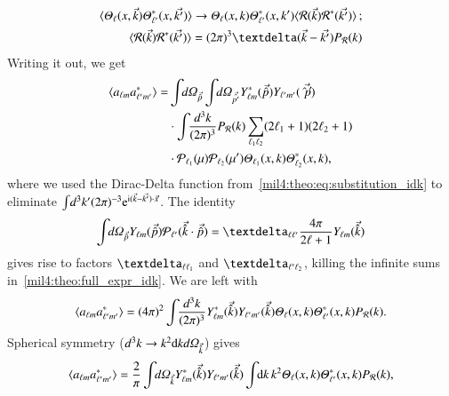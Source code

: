 \begin{equation}\label{mil4:theo:eq:substitution_idk}
\begin{split}
    \langle \Theta_\ell(x,\vec{k}) \Theta_{\ell'}^*(x,\vec{k'})\rangle \to \Theta_\ell(x,k) \Theta_{\ell'}^*(x,k') \langle \mathcal{R}(\vec{k}) \mathcal{R}^*(\vec{k'}) \rangle \,; \\
    \quad \langle \mathcal{R}(\vec{k}) \mathcal{R}^*(\vec{k'}) \rangle = (2\pi)^3 \deltafunc{\vec{k}-\vec{k'}} P_\mathcal{R}(k) 
\end{split}
\end{equation}
Writing it out, we get
\begin{equation}\label{mil4:theo:full_expr_idk}
\begin{split}
    \langle a\ellm a^*\ellmp \rangle =&  \int \dOmg[p] \int \dOmg[p'] Y_{\ell m}^*(\vec{\hat{p}}) Y_{\ell' m'}(\vec{\hat{p}'})  \\
    &\cdot \int \dkkk P_\mathcal{R}(k)  \sum_{\ell_1 \ell_2} (2\ell_1 +1) (2\ell_2 +1) \\
    &\cdot \mathcal{P}_{\ell_1}(\mu)\mathcal{P}_{\ell_2}(\mu')\Theta_{\ell_1}(x,k) \Theta^{*}_{\ell_2}(x,k) ,
\end{split}
\end{equation} 
where we used the Dirac-Delta function from~\cref{mil4:theo:eq:substitution_idk} to eliminate $\int \! d^3k' (2\pi)^{-3} \eu[\im (\vec{k}-\vec{k'})\cdot \vec{x}]$. The identity 
\begin{equation}
    \int \dOmg[p] Y\ellm (\vec{\hat{p}}) \mathcal{P}_{\ell'}(\vec{\hat{k}}\cdot \vec{\hat{p}}) = \deltasym{\ell \ell'} \frac{4\pi}{2\ell +1}Y\ellm (\vec{\hat{k}})
\end{equation}
gives rise to factors $\deltasym{\ell \ell_1}$ and $\deltasym{\ell' \ell_2}$, killing the infinite sums in~\cref{mil4:theo:full_expr_idk}. We are left with
\begin{equation}
    \langle a\ellm a^*\ellmp \rangle =  (4\pi)^2 \int \dkkk Y_{\ell m}^*(\vec{\hat{k}}) Y_{\ell' m'}(\vec{\hat{k}})  \Theta_{\ell}(x,k) \Theta^{*}_{\ell'}(x,k) P_\mathcal{R}(k).
\end{equation}
Spherical symmetry ($d^3k \to k^2 \, \dx{k} \,\dOmg[k]$) gives 
\begin{equation}
    \langle a\ellm a^*\ellmp \rangle = \frac{2}{\pi} \int \dOmg[k] Y_{\ell m}^\ast(\vec{\hat{k}}) Y_{\ell' m'}(\vec{\hat{k}}) \int \dx{k} k^2  \Theta_{\ell}(x,k) \Theta^{*}_{\ell'}(x,k)  P_\mathcal{R}(k),
\end{equation}
